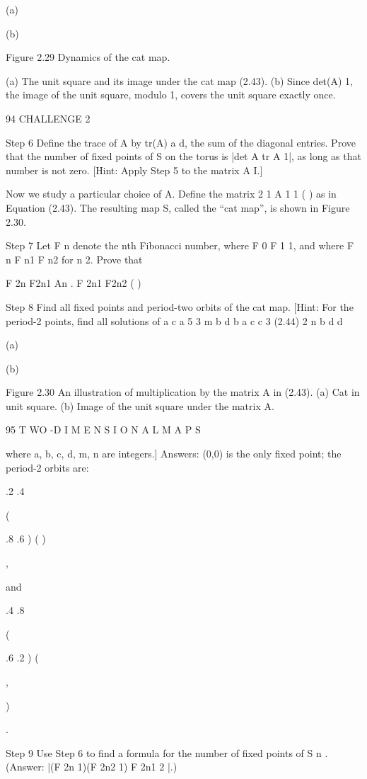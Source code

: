 \documentclass[12pt]{article}
\begin{document}
(a)

(b)

Figure 2.29 Dynamics of the cat map.

(a) The unit square and its image under the cat map (2.43). (b) Since det(A)  1, the image of the unit square, modulo 1, covers the 
unit square exactly once.

94 CHALLENGE 2

Step 6 Deﬁne the trace of A by tr(A)  a  d, the sum of the diagonal entries. Prove that the number of ﬁxed points of S on the torus 
is |det A  tr A  1|, as long as that number is not zero. [Hint: Apply Step 5 to the matrix A  I.]

Now we study a particular choice of A. Deﬁne the matrix 2 1 A 1 1 ( ) as in Equation (2.43). The resulting map S, called the “cat 
map”, is shown in Figure 2.30.

Step 7 Let F n denote the nth Fibonacci number, where F 0  F 1  1, and where F n  F n1  F n2 for n 
 2. Prove that

F 2n F2n1  An  . F 2n1 F2n2  ( )

Step 8 Find all ﬁxed points and period-two orbits of the cat map. [Hint: For the period-2 points, ﬁnd all solutions of a c a   5 3  
m b d b a c c   3 (2.44) 2  n b d d

(a)

(b)

Figure 2.30 An illustration of multiplication by the matrix A in (2.43). (a) Cat in unit square. (b) Image of the unit square under 
the matrix A.

95 T WO -D I M E N S I O N A L M A P S

where a, b, c, d, m, n are integers.] Answers: (0,0) is the only ﬁxed point; the period-2 orbits are:

.2 .4 {(

.8 .6 ) ( )}

,

and

.4 .8 {(

.6 .2 ) (

,

)}

.

Step 9 Use Step 6 to ﬁnd a formula for the number of ﬁxed points of S n . (Answer: |(F 2n  1)(F 2n2  1)  F 2n1 2 |.)
\end{document}
